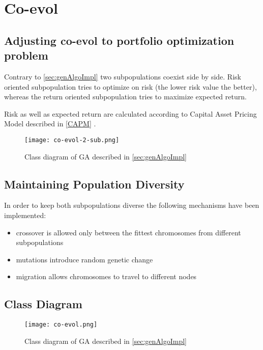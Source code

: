 \section{Co-evol}

\subsection{Adjusting co-evol to portfolio optimization problem}

Contrary to \ref{sec:genAlgoImpl} two subpopulations coexist side by side.
Risk oriented subpopulation tries to optimize on risk (the lower risk value the better), whereas the return oriented subpopulation tries to maximize expected return.

Risk as well as expected return are calculated according to Capital Asset Pricing Model described in \ref{CAPM} .


\begin{figure}[H]   
	    \begin{center}
	      \texttt{[image: co-evol-2-sub.png]}
	    \end{center}
	    \caption{Class diagram of GA described in \ref{sec:genAlgoImpl}} 
	  \end{figure}

\subsection{Maintaining Population Diversity}


In order to keep both subpopulations diverse the following mechanisms have been implemented:

\begin{itemize}
  \item crossover is allowed only between the fittest chromosomes from different subpopulations 
  \item mutations introduce random genetic change
  \item migration allows chromosomes to travel to different nodes 
 
\end{itemize}




\subsection{Class Diagram}

\begin{figure}[H]   
	    \begin{center}
	      \texttt{[image: co-evol.png]}
	    \end{center}
	    \caption{Class diagram of GA described in \ref{sec:genAlgoImpl}} 
	  \end{figure}


